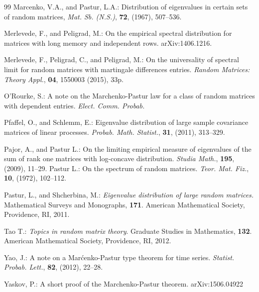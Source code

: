 \documentclass[12pt, a4paper]{article}
\begin{document}
\begin{thebibliography}{99}
 Marcenko, V.A., and Pastur, L.A.: Distribution of eigenvalues in certain sets of random
matrices, {\it  Mat. Sb. (N.S.)}, {\bf 72}, (1967), 507--536.

 Merlevede, F., and Peligrad, M.: On the empirical spectral distribution for matrices with long memory and independent rows. arXiv:1406.1216.


 Merlevede, F., Peligrad, C., and Peligrad, M.: On the universality of spectral limit for random matrices with martingale differences entries. {\it Random Matrices: Theory Appl.}, {\bf 04}, 1550003 (2015), 33p.

 O'Rourke, S.: A note on the Marchenko-Pastur law for a class of random matrices with dependent entries. {\it Elect. Comm. Probab.}


 Pfaffel, O., and Schlemm, E.: Eigenvalue distribution of large sample covariance
matrices of linear processes. {\it Probab. Math. Statist.}, {\bf 31}, (2011), 313--329.

 Pajor, A., and Pastur L.: On the limiting empirical measure of eigenvalues of the sum of rank one matrices with log-concave distribution. {\it Studia Math.}, {\bf 195}, (2009), 11--29.
  Pastur L.: On the spectrum of random matrices. {\it Teor. Mat. Fiz.}, {\bf 10}, (1972), 102--112.


 Pastur, L., and Shcherbina, M.: {\it Eigenvalue distribution of large random matrices.} Mathematical Surveys and Monographs, {\bf 171}. American Mathematical Society,
Providence, RI, 2011.

 Tao T.: {\it Topics in random matrix theory}. Graduate Studies in Mathematics, {\bf 132}. American
Mathematical Society, Providence, RI, 2012. 

 Yao, J.: A note on a Mar\'cenko-Pastur type theorem for time series. {\it Statist. Probab.
Lett.}, {\bf 82}, (2012), 22--28.


 Yaskov, P.: A short proof of the Marchenko-Pastur theorem. arXiv:1506.04922

\end{thebibliography}
\end{document}
